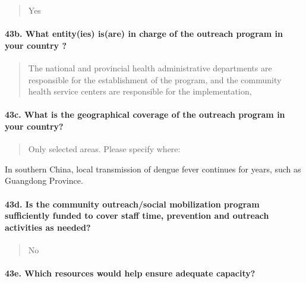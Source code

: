 \documentclass[
]{article}
\begin{document}
\begin{quote}
Yes
\end{quote}

\hypertarget{b.-what-entityies-isare-in-charge-of-the-outreach-program-in-your-country}{%
\paragraph{43b. What entity(ies) is(are) in charge of the outreach
program in your country
?}\label{b.-what-entityies-isare-in-charge-of-the-outreach-program-in-your-country}}

\begin{quote}
The national and provincial health administrative departments are
responsible for the establishment of the program, and the community
health service centers are responsible for the implementation,
\end{quote}

\hypertarget{c.-what-is-the-geographical-coverage-of-the-outreach-program-in-your-country}{%
\paragraph{43c. What is the geographical coverage of the outreach
program in your
country?}\label{c.-what-is-the-geographical-coverage-of-the-outreach-program-in-your-country}}

\begin{quote}
Only selected areas. Please specify where:
\end{quote}

In southern China, local transmission of dengue fever continues for
years, such as Guangdong Province.

\hypertarget{d.-is-the-community-outreachsocial-mobilization-program-sufficiently-funded-to-cover-staff-time-prevention-and-outreach-activities-as-needed}{%
\paragraph{43d. Is the community outreach/social mobilization program
sufficiently funded to cover staff time, prevention and outreach
activities as
needed?}\label{d.-is-the-community-outreachsocial-mobilization-program-sufficiently-funded-to-cover-staff-time-prevention-and-outreach-activities-as-needed}}

\begin{quote}
No
\end{quote}

\hypertarget{e.-which-resources-would-help-ensure-adequate-capacity}{%
\paragraph{43e. Which resources would help ensure adequate
capacity?}\label{e.-which-resources-would-help-ensure-adequate-capacity}}
\end{document}
